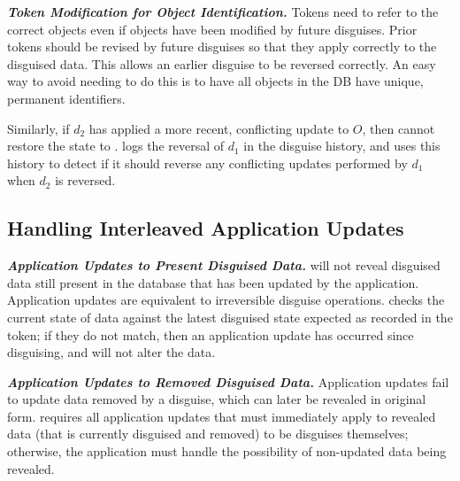 
\vspace{6pt}\noindent\textbf{\emph{Token Modification for Object Identification.}}
Tokens need to refer to the correct objects even if objects have been modified by future disguises.
Prior tokens should be revised by future disguises so that they apply correctly to the disguised
data.
This allows an earlier disguise to be reversed correctly.
An easy way to avoid needing to do this is to have all objects in the DB have unique, permanent
identifiers.

Similarly, if $d_2$ has applied a more recent, conflicting update to $O$, then \sys cannot restore
the state to \ostart. 
\sys logs the reversal of $d_1$ in the disguise history, and uses this history to detect if it
should reverse any conflicting updates performed by $d_1$ when $d_2$ is reversed.


\iffalse
\subsection{Handling Interleaved Application Updates}
\noindent\textbf{\emph{Application Updates to Present Disguised Data.}}
\sys will not reveal disguised data still present in the database that has been updated by the
application. Application updates are equivalent to irreversible disguise operations.
\sys checks the current state of data against the latest disguised state
expected as recorded in the token; if they do not match, then an application update has occurred
since disguising, and \sys will not alter the data.

\vspace{6pt}\noindent\textbf{\emph{Application Updates to Removed Disguised Data.}}
Application updates fail to update data removed by a disguise, which can later be revealed in
original form.
\sys requires all application updates that must immediately apply to revealed data (that is
currently disguised and removed) to be disguises themselves; otherwise, the application must handle
the possibility of non-updated data being revealed.


